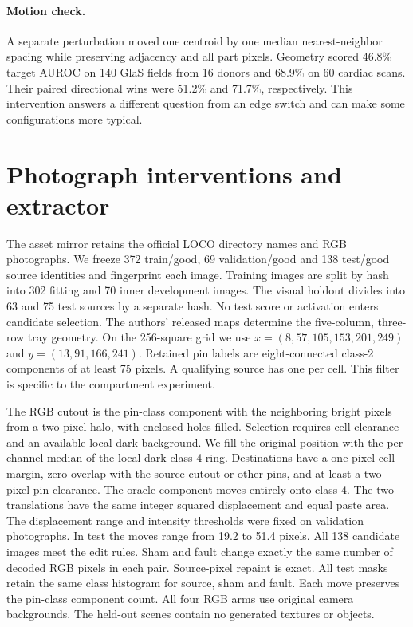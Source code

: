 \documentclass[10pt,twocolumn,letterpaper]{article}
\begin{document}
\paragraph{Motion check.}
A separate perturbation moved one centroid by one median nearest-neighbor spacing while preserving adjacency and all part pixels. Geometry scored 46.8\% target AUROC on 140 GlaS fields from 16 donors and 68.9\% on 60 cardiac scans. Their paired directional wins were 51.2\% and 71.7\%, respectively. This intervention answers a different question from an edge switch and can make some configurations more typical.

\section{Photograph interventions and extractor}
The asset mirror retains the official LOCO directory names and RGB photographs. We freeze 372 train/good, 69 validation/good and 138 test/good source identities and fingerprint each image. Training images are split by hash into 302 fitting and 70 inner development images. The visual holdout divides into 63 and 75 test sources by a separate hash. No test score or activation enters candidate selection. The authors' released maps determine the five-column, three-row tray geometry. On the 256-square grid we use $x=(8,57,105,153,201,249)$ and $y=(13,91,166,241)$. Retained pin labels are eight-connected class-2 components of at least 75 pixels. A qualifying source has one per cell. This filter is specific to the compartment experiment.

The RGB cutout is the pin-class component with the neighboring bright pixels from a two-pixel halo, with enclosed holes filled. Selection requires cell clearance and an available local dark background. We fill the original position with the per-channel median of the local dark class-4 ring. Destinations have a one-pixel cell margin, zero overlap with the source cutout or other pins, and at least a two-pixel pin clearance. The oracle component moves entirely onto class 4. The two translations have the same integer squared displacement and equal paste area. The displacement range and intensity thresholds were fixed on validation photographs. In test the moves range from 19.2 to 51.4 pixels. All 138 candidate images meet the edit rules. Sham and fault change exactly the same number of decoded RGB pixels in each pair. Source-pixel repaint is exact. All test masks retain the same class histogram for source, sham and fault. Each move preserves the pin-class component count. All four RGB arms use original camera backgrounds. The held-out scenes contain no generated textures or objects.
\end{document}
